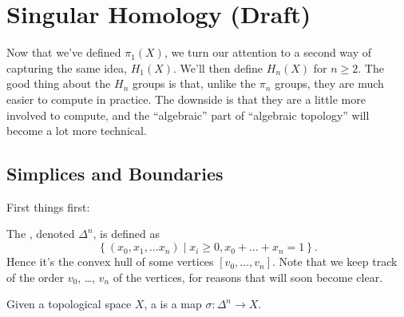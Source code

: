 \chapter{Singular Homology (Draft)}
Now that we've defined $\pi_1(X)$, we turn our attention to a second way of capturing the same idea, $H_1(X)$.
We'll then define $H_n(X)$ for $n \ge 2$.
The good thing about the $H_n$ groups is that, unlike the $\pi_n$ groups, they are much easier to compute in practice.
The downside is that they are a little more involved to compute,
and the ``algebraic'' part of ``algebraic topology'' will become a lot more technical.

\section{Simplices and Boundaries}
First things first:
\begin{definition}
	The , denoted $\Delta^n$, is defined as
	\[ \left\{ (x_0 , x_1, \dots x_n) \mid x_i \ge 0, x_0+\dots+x_n=1 \right\}. \]
	Hence it's the convex hull of some vertices $[v_0, \dots, v_n]$.
	Note that we keep track of the order $v_0$, \dots, $v_n$ of the vertices,
	for reasons that will soon become clear.

	Given a topological space $X$, a  is a map $\sigma : \Delta^n \to X$.
\end{definition}
